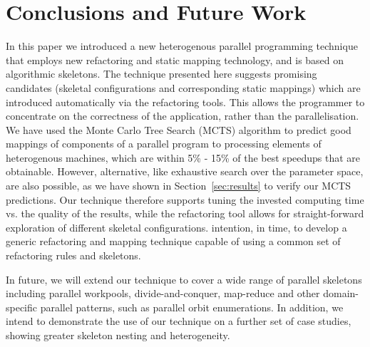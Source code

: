 \documentclass[smallextended]{svjour3}
\begin{document}
\section{Conclusions and Future Work}
\noindent
In this paper we introduced a new heterogenous parallel programming technique that employs new
refactoring and static mapping technology, and is based on algorithmic
skeletons. %
The technique presented here suggests promising candidates (skeletal configurations and corresponding static mappings) which are introduced
automatically via the refactoring tools.
This allows the programmer to concentrate on 
the correctness of the application, rather than the parallelisation. 
%
We have used the Monte Carlo Tree Search (MCTS) algorithm to predict
good mappings of components of a parallel program to processing
elements of heterogenous machines, which are within 5\% - 15\% of the best speedups that are obtainable. However, alternative, like exhaustive search over the parameter space, are also possible, as we have shown in Section~\ref{sec:results} to verify our MCTS predictions.
Our technique therefore supports tuning the invested computing time vs. the quality of the results, while the refactoring tool allows for straight-forward exploration of different skeletal configurations. %
 intention, in time, to develop
a generic refactoring and mapping technique capable of using a common set of refactoring rules and skeletons.  

In future, we will extend our technique to cover a wide range of parallel skeletons
including parallel workpools, divide-and-conquer, map-reduce and other domain-specific
parallel patterns, such as parallel orbit enumerations.
In addition, we intend to demonstrate the use of our technique on a further set of case studies, showing greater skeleton nesting and  heterogeneity. %
\end{document}
